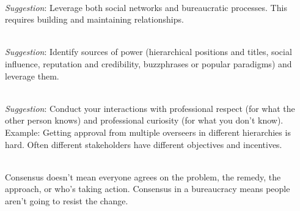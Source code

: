 \ \\
\textit{Suggestion}: Leverage both social networks and bureaucratic processes. This requires building and maintaining relationships. 

\ \\
\textit{Suggestion}: Identify sources of power (hierarchical positions and titles, social influence, reputation and credibility, buzzphrases or popular paradigms) and leverage them.

\ \\
\textit{Suggestion}: Conduct your interactions with professional respect (for what the other person knows) and professional curiosity (for what you don't know). \\
Example: Getting approval from multiple overseers in different hierarchies is hard. Often different stakeholders have different objectives and incentives.



\ \\
Consensus doesn't mean everyone agrees on the problem, the remedy, the approach, or who's taking action. Consensus in a bureaucracy means people aren't going to resist the change.